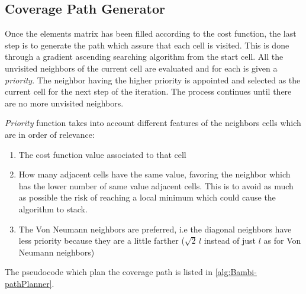 \subsection{Coverage Path Generator} %
\label{sub:coverage_path_generator}
Once the elements matrix has been filled according to the cost function, the last step is to generate the path which assure that each cell is visited. This is done through a gradient ascending searching algorithm from the start cell. All the unvisited neighbors of the current cell are evaluated and for each is given a \textit{priority}. The neighbor having the higher priority is appointed and selected as the current cell for the next step of the iteration. The process continues until there are no more unvisited neighbors.\par
\textit{Priority} function takes into account different features of the neighbors cells which are in order of relevance:
\begin{enumerate}
	\item The cost function value associated to that cell
	\item How many adjacent cells have the same value, favoring the neighbor which has the lower number of same value adjacent cells. This is to avoid as much as possible the risk of reaching a local minimum which could cause the algorithm to stack.
	\item The Von Neumann neighbors are preferred, i.e the diagonal neighbors have less priority because they are a little farther ($\sqrt{2}\,l$ instead of just $l$ as for Von Neumann neighbors)
\end{enumerate}
The pseudocode which plan the coverage path is listed in \autoref{alg:Bambi-pathPlanner}.\\

